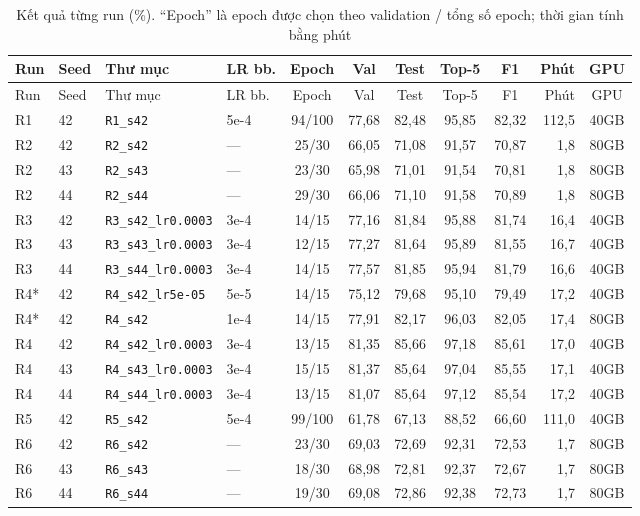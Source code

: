 \documentclass[12pt,a4paper]{article}
\begin{document}
{\footnotesize
\begin{longtable}{llllcccccrc}
\caption{Kết quả từng run (\%). ``Epoch'' là epoch được chọn theo validation / tổng
số epoch; thời gian tính bằng phút}
\label{tab:all}\\
\toprule
Run & Seed & Thư mục & LR bb. & Epoch & Val & Test & Top-5 & F1 & Phút & GPU \\
\midrule
\endfirsthead
\toprule
Run & Seed & Thư mục & LR bb. & Epoch & Val & Test & Top-5 & F1 & Phút & GPU \\
\midrule
\endhead
R1 & 42 & \texttt{R1\_s42} & 5e-4 & 94/100 & 77,68 & 82,48 & 95,85 & 82,32 & 112,5 & 40GB \\
R2 & 42 & \texttt{R2\_s42} & --- & 25/30 & 66,05 & 71,08 & 91,57 & 70,87 & 1,8 & 80GB \\
R2 & 43 & \texttt{R2\_s43} & --- & 23/30 & 65,98 & 71,01 & 91,54 & 70,81 & 1,8 & 80GB \\
R2 & 44 & \texttt{R2\_s44} & --- & 29/30 & 66,06 & 71,10 & 91,58 & 70,89 & 1,8 & 80GB \\
R3 & 42 & \texttt{R3\_s42\_lr0.0003} & 3e-4 & 14/15 & 77,16 & 81,84 & 95,88 & 81,74 & 16,4 & 40GB \\
R3 & 43 & \texttt{R3\_s43\_lr0.0003} & 3e-4 & 12/15 & 77,27 & 81,64 & 95,89 & 81,55 & 16,7 & 40GB \\
R3 & 44 & \texttt{R3\_s44\_lr0.0003} & 3e-4 & 14/15 & 77,57 & 81,85 & 95,94 & 81,79 & 16,6 & 40GB \\
R4* & 42 & \texttt{R4\_s42\_lr5e-05} & 5e-5 & 14/15 & 75,12 & 79,68 & 95,10 & 79,49 & 17,2 & 40GB \\
R4* & 42 & \texttt{R4\_s42} & 1e-4 & 14/15 & 77,91 & 82,17 & 96,03 & 82,05 & 17,4 & 80GB \\
R4 & 42 & \texttt{R4\_s42\_lr0.0003} & 3e-4 & 13/15 & 81,35 & 85,66 & 97,18 & 85,61 & 17,0 & 40GB \\
R4 & 43 & \texttt{R4\_s43\_lr0.0003} & 3e-4 & 15/15 & 81,37 & 85,64 & 97,04 & 85,55 & 17,1 & 40GB \\
R4 & 44 & \texttt{R4\_s44\_lr0.0003} & 3e-4 & 13/15 & 81,07 & 85,64 & 97,12 & 85,54 & 17,2 & 40GB \\
R5 & 42 & \texttt{R5\_s42} & 5e-4 & 99/100 & 61,78 & 67,13 & 88,52 & 66,60 & 111,0 & 40GB \\
R6 & 42 & \texttt{R6\_s42} & --- & 23/30 & 69,03 & 72,69 & 92,31 & 72,53 & 1,7 & 80GB \\
R6 & 43 & \texttt{R6\_s43} & --- & 18/30 & 68,98 & 72,81 & 92,37 & 72,67 & 1,7 & 80GB \\
R6 & 44 & \texttt{R6\_s44} & --- & 19/30 & 69,08 & 72,86 & 92,38 & 72,73 & 1,7 & 80GB \\

\end{longtable}}
\end{document}
